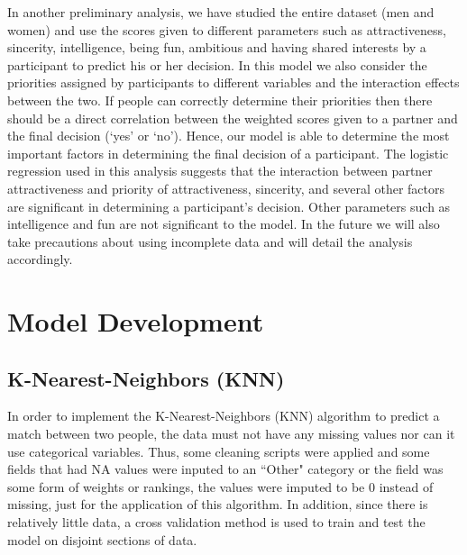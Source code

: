 \documentclass{article}
\begin{document}
In another preliminary analysis, we have studied the entire dataset (men and women) and use the scores given to different parameters such as attractiveness, sincerity, intelligence, being fun, ambitious and having shared interests by a participant to predict his or her decision. In this model we also consider the priorities assigned by participants to different variables and the interaction effects between the two. If people can correctly determine their priorities then there should be a direct correlation between the weighted scores given to a partner and the final decision (`yes' or `no').  Hence, our model is able to determine the most important factors in determining the final decision of a participant. The logistic regression used in this analysis suggests that the interaction between partner attractiveness and priority of attractiveness, sincerity, and several other factors are significant in determining a participant's decision.  Other parameters such as intelligence and fun are not significant to the model.  In the future we will also take precautions about using incomplete data and will detail the analysis accordingly.\\


 
\section{Model Development}
\subsection{K-Nearest-Neighbors (KNN)}
In order to implement the K-Nearest-Neighbors (KNN) algorithm to predict a match between two people, the data must not have any missing values nor can it use categorical variables.  Thus, some cleaning scripts were applied and some fields that had NA values were inputed to an ``Other" category or the field was some form of weights or rankings, the values were imputed to be 0 instead of missing, just for the application of this algorithm.  In addition, since there is relatively little data, a cross validation method is used to train and test the model on disjoint sections of data.
\end{document}
